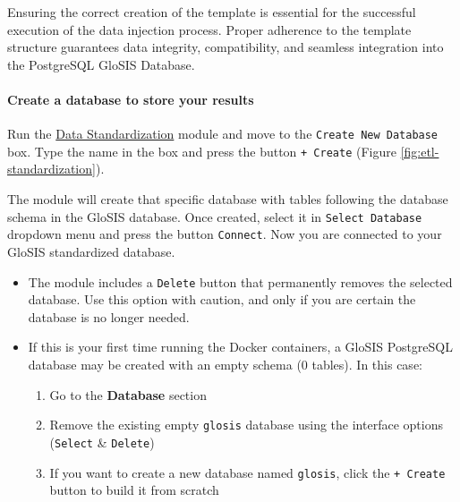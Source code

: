 \documentclass[
  10pt,
  b5paper,
  oneside]{book}
\providecommand{\tightlist}{%
  \setlength{\itemsep}{0pt}\setlength{\parskip}{0pt}}
\begin{document}
Ensuring the correct creation of the template is essential for the successful execution of the data injection process. Proper adherence to the template structure guarantees data integrity, compatibility, and seamless integration into the PostgreSQL GloSIS Database.

\paragraph*{Create a database to store your results}\label{create-a-database-to-store-your-results}

Run the \href{http://localhost:3000/standardization}{Data Standardization} module and move to the \texttt{Create\ New\ Database} box. Type the name in the box and press the button \texttt{+\ Create} (Figure \ref{fig:etl-standardization}).

The module will create that specific database with tables following the database schema in the GloSIS database. Once created, select it in \texttt{Select\ Database} dropdown menu and press the button \texttt{Connect}. Now you are connected to your GloSIS standardized database.

\begin{itemize}
\tightlist
\item
  The module includes a \texttt{Delete} button that permanently removes the selected database. Use this option with caution, and only if you are certain the database is no longer needed.
\item
  If this is your first time running the Docker containers, a GloSIS PostgreSQL database may be created with an empty schema (0 tables).
  In this case:

  \begin{enumerate}
  \def\labelenumi{\alph{enumi})}
  \tightlist
  \item
    Go to the \textbf{Database} section\\
  \item
    Remove the existing empty \texttt{glosis} database using the interface options (\texttt{Select} \& \texttt{Delete})\\
  \item
    If you want to create a new database named \texttt{glosis}, click the \texttt{+\ Create} button to build it from scratch\\
  \end{enumerate}
\end{itemize}
\end{document}
